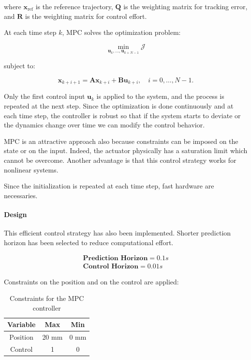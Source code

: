 where $\mathbf{x}_{\text{ref}}$ is the reference trajectory, $\mathbf{Q}$ is the weighting matrix for tracking error, and $\mathbf{R}$ is the weighting matrix for control effort.

At each time step $k$, MPC solves the optimization problem:

\begin{equation}
    \min_{\mathbf{u}_k, \ldots, \mathbf{u}_{k+N-1}} \mathcal{J}
\end{equation}

subject to:

\begin{equation}
    \mathbf{x}_{k+i+1} = \mathbf{A} \mathbf{x}_{k+i} + \mathbf{B} \mathbf{u}_{k+i}, \quad i = 0, \ldots, N-1.
\end{equation}

Only the first control input $\mathbf{u}_k$ is applied to the system, and the process is repeated at the next step. Since the optimization is done continuously and at each time step, the controller is robust so that if the system starts to deviate or the dynamics change over time we can modify the control behavior.

MPC is an attractive approach also because constraints can be imposed on the state or on the input. Indeed, the actuator physically has a saturation limit which cannot be overcome. Another advantage is that this control strategy works for nonlinear systems.

Since the initialization is repeated at each time step, fast hardware are necessaries.

\paragraph{Design} This efficient control strategy has also been implemented. Shorter prediction horizon has been selected to reduce computational effort.

\begin{equation}
    \begin{aligned}
        \textbf{Prediction Horizon} = 0.1s \\ \textbf{Control Horizon}=0.01s
    \end{aligned}
\end{equation}

Constraints on the position and on the control are applied:

\begin{table}[H]
    \centering
    \begin{tabular}{|c|c|c|}
        \hline
        \textbf{Variable} & \textbf{Max} & \textbf{Min} \\ \hline
        Position          & 20 mm        & 0 mm         \\ \hline
        Control           & 1            & 0            \\ \hline
        \hline
    \end{tabular}
    \caption{Constraints for the MPC controller}
\end{table}

